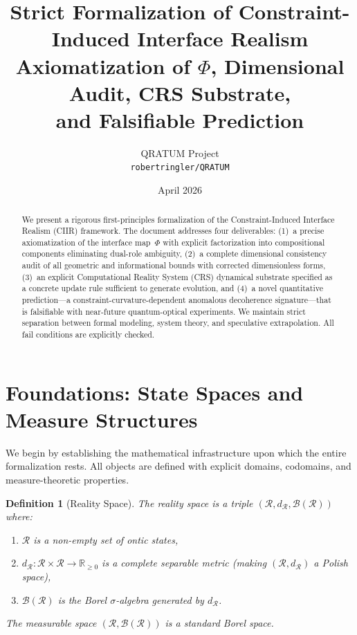 \documentclass[11pt,a4paper]{article}
\title{%
  \textbf{Strict Formalization of Constraint-Induced Interface Realism}\\[6pt]
  \large Axiomatization of $\Phi$, Dimensional Audit, CRS Substrate,\\
  and Falsifiable Prediction
}
\author{%
  QRATUM Project\\
  \texttt{robertringler/QRATUM}
}
\date{April 2026}
\newtheorem{definition}{Definition}[section]
\theoremstyle{remark}
\newcommand{\CR}{\mathcal{R}}
\begin{document}
\maketitle

\begin{abstract}
We present a rigorous first-principles formalization of the
Constraint-Induced Interface Realism (CIIR) framework.  The document
addresses four deliverables: (1)~a precise axiomatization of the
interface map~$\Phi$ with explicit factorization into compositional
components eliminating dual-role ambiguity, (2)~a complete dimensional
consistency audit of all geometric and informational bounds with
corrected dimensionless forms, (3)~an explicit Computational Reality
System (CRS) dynamical substrate specified as a concrete update rule
sufficient to generate evolution, and (4)~a novel quantitative
prediction---a constraint-curvature-dependent anomalous decoherence
signature---that is falsifiable with near-future quantum-optical
experiments.  We maintain strict separation between formal modeling,
system theory, and speculative extrapolation.  All fail conditions are
explicitly checked.
\end{abstract}

\tableofcontents
\newpage

\section{Foundations: State Spaces and Measure Structures}
\label{sec:foundations}

We begin by establishing the mathematical infrastructure upon which the
entire formalization rests.  All objects are defined with explicit
domains, codomains, and measure-theoretic properties.

\begin{definition}[Reality Space]
\label{def:reality}
The \emph{reality space} is a triple $(\CR, d_{\CR}, \mathcal{B}(\CR))$
where:
\begin{enumerate}[label=(\roman*)]
  \item $\CR$ is a non-empty set of \emph{ontic states},
  \item $d_{\CR}: \CR \times \CR \to \mathbb{R}_{\geq 0}$ is a
    complete separable metric (making $(\CR, d_{\CR})$ a Polish space),
  \item $\mathcal{B}(\CR)$ is the Borel $\sigma$-algebra generated by
    $d_{\CR}$.
\end{enumerate}
The measurable space $(\CR, \mathcal{B}(\CR))$ is a standard Borel
space.
\end{definition}
\end{document}
